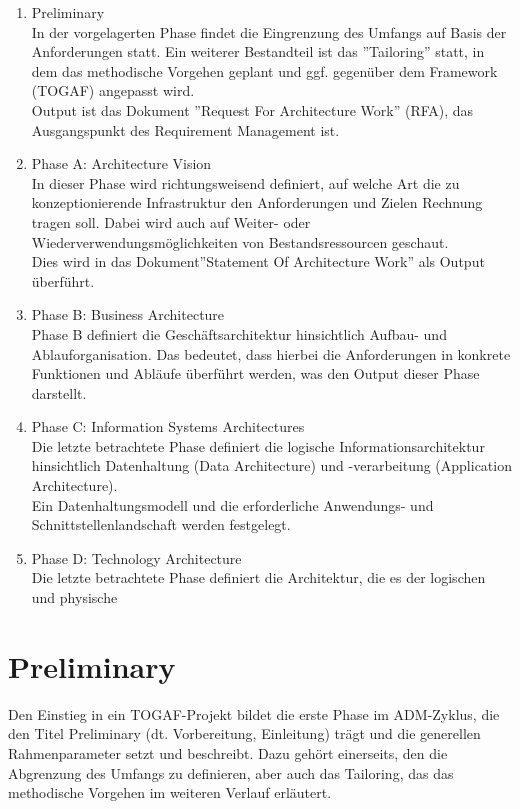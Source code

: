 \begin{enumerate}
\item{Preliminary}
\\ In der vorgelagerten Phase findet die Eingrenzung des Umfangs auf Basis der Anforderungen statt. 
Ein weiterer Bestandteil ist das ''Tailoring'' statt, in dem das methodische Vorgehen geplant und ggf. gegenüber dem Framework (TOGAF) angepasst wird.\\
Output ist das Dokument ''Request For Architecture Work'' (RFA), das Ausgangspunkt des Requirement Management ist.
\item{Phase A: Architecture Vision}
\\ In dieser Phase wird richtungsweisend definiert, auf welche Art die zu konzeptionierende Infrastruktur den Anforderungen und Zielen Rechnung tragen soll. Dabei wird auch auf Weiter- oder Wiederverwendungsmöglichkeiten von Bestandsressourcen geschaut.\\
Dies wird in das Dokument''Statement Of Architecture Work'' als Output überführt.
\item{Phase B: Business Architecture}
\\ Phase B definiert die Geschäftsarchitektur hinsichtlich Aufbau- und Ablauforganisation. Das bedeutet, dass hierbei die Anforderungen in konkrete Funktionen und Abläufe überführt werden, was den Output dieser Phase darstellt.
\item{Phase C: Information Systems Architectures}
\\ Die letzte betrachtete Phase definiert die logische Informationsarchitektur hinsichtlich Datenhaltung (Data Architecture) und -verarbeitung (Application Architecture). \\
Ein Datenhaltungsmodell und die erforderliche Anwendungs- und Schnittstellenlandschaft werden festgelegt.
\item{Phase D: Technology Architecture}
\\ Die letzte betrachtete Phase definiert die Architektur, die es der logischen und physische



\end{enumerate}


\section{Preliminary}
Den Einstieg in ein TOGAF-Projekt bildet die erste Phase im ADM-Zyklus, die den Titel Preliminary (dt. Vorbereitung, Einleitung) trägt und die generellen Rahmenparameter setzt und beschreibt.
Dazu gehört einerseits, den die Abgrenzung des Umfangs zu definieren, aber auch das Tailoring, das das methodische Vorgehen im weiteren Verlauf erläutert.

